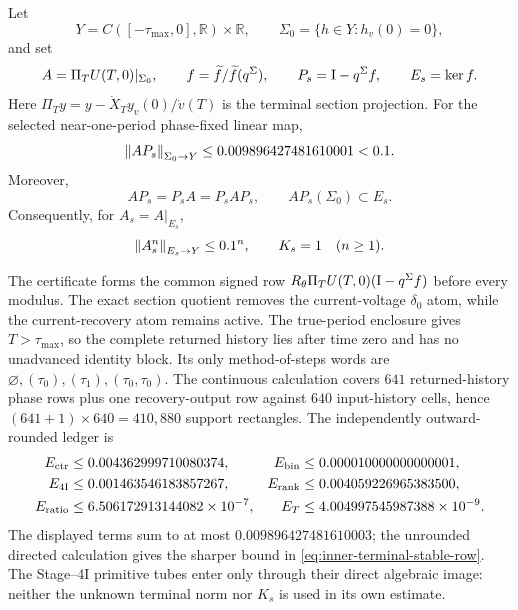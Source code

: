 \begin{proposition}
\label{prop:inner-terminal-stable-row}
Let
\[
 Y=C([-\tau_{\max},0],\mathbb R)\times\mathbb R,
 \qquad \Sigma_0=\{h\in Y:h_v(0)=0\},
\]
and set
\[
 A=\Pi_TU(T,0)|_{\Sigma_0},\qquad
 f=\widetilde f/\widetilde f(q^\Sigma),\qquad
 P_s=\mathrm I-q^\Sigma f,\qquad E_s=\ker f.
\]
Here \(\Pi_Ty=y-\dot X_Ty_v(0)/\dot v(T)\) is the terminal section
projection.
For the selected near-one-period phase-fixed linear map,
\begin{equation}
 \left\lVert AP_s\right\rVert_{\Sigma_0\to Y}
 \le0.009896427481610001<0.1.                 \label{eq:inner-terminal-stable-row}
\end{equation}
Moreover,
\[
 AP_s=P_sA=P_sAP_s,
 \qquad AP_s(\Sigma_0)\subset E_s.
\]
Consequently, for \(A_s=A|_{E_s}\),
\begin{equation}
 \left\lVert A_s^n\right\rVert_{E_s\to Y}\le0.1^n,
 \qquad K_s=1\quad(n\ge1).                   \label{eq:inner-stable-power}
\end{equation}
\end{proposition}

The certificate forms the common signed row
\(R_\theta\Pi_TU(T,0)(\mathrm I-q^\Sigma f)\) before every modulus.  The exact
section quotient removes the current-voltage \(\delta_0\) atom, while the
current-recovery atom remains active.  The true-period enclosure gives
\(T>\tau_{\max}\), so the complete returned history lies after time zero and
has no unadvanced identity block.  Its only method-of-steps words are
\(\varnothing,(\tau_0),(\tau_1),(\tau_0,\tau_0)\).  The continuous calculation
covers \(641\) returned-history phase rows plus one recovery-output row against
\(640\) input-history cells, hence \((641+1)\times640=410{,}880\) support
rectangles.  The independently outward-rounded ledger is
\begin{align*}
 E_{\rm ctr}&\le0.004362999710080374,
 &E_{\rm bin}&\le0.000010000000000001,\\
 E_{\rm 4I}&\le0.001463546183857267,
 &E_{\rm rank}&\le0.004059226965383500,\\
 E_{\rm ratio}&\le6.506172913144082\times10^{-7},
 &E_T&\le4.004997545987388\times10^{-9}.
\end{align*}
The displayed terms sum to at most \(0.009896427481610003\); the unrounded
directed calculation gives the sharper bound in
\cref{eq:inner-terminal-stable-row}.  The Stage--4I primitive tubes enter only
through their direct algebraic image: neither the unknown terminal norm nor
\(K_s\) is used in its own estimate.


